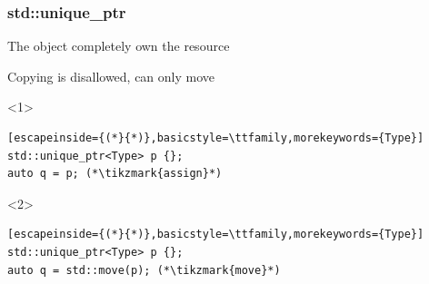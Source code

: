 \documentclass[14pt,a4paper,dvipsnames,usenames]{beamer}
\begin{document}
\begin{frame}[fragile]
  \frametitle{std{\color{ICantExpress}::}{\color{FeebleWeek}unique\_ptr}}

  The object completely own the resource

  \vspace{1em}
  Copying is disallowed, can only move

  \begin{onlyenv}<1>
  \vspace{1em}
  \begin{lstlisting}[escapeinside={(*}{*)},basicstyle=\ttfamily,morekeywords={Type}]
std::unique_ptr<Type> p {};
auto q = p; (*\tikzmark{assign}*)
  \end{lstlisting}

  \nointerlineskip
  \end{onlyenv}

  \begin{onlyenv}<2>
  \vspace{1em}
  \begin{lstlisting}[escapeinside={(*}{*)},basicstyle=\ttfamily,morekeywords={Type}]
std::unique_ptr<Type> p {};
auto q = std::move(p); (*\tikzmark{move}*)
  \end{lstlisting}

  \nointerlineskip
  \end{onlyenv}
  
  \CPPEleven

  
\end{frame}
\end{document}
